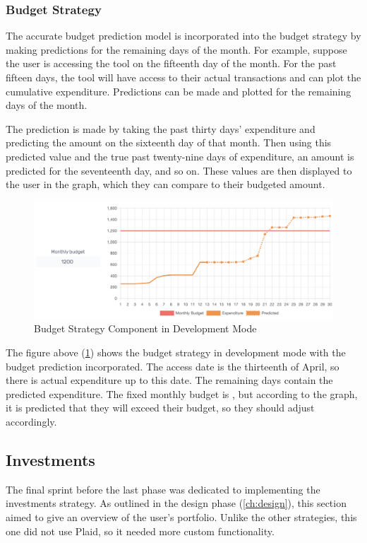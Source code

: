 \subsubsection{Budget Strategy}
The accurate budget prediction model is incorporated into the budget strategy by making predictions for the remaining days of the month. For example, suppose the user is accessing the tool on the fifteenth day of the month. For the past fifteen days, the tool will have access to their actual transactions and can plot the cumulative expenditure. Predictions can be made and plotted for the remaining days of the month.

The prediction is made by taking the past thirty days' expenditure and predicting the amount on the sixteenth day of that month. Then using this predicted value and the true past twenty-nine days of expenditure, an amount is predicted for the seventeenth day, and so on. These values are then displayed to the user in the graph, which they can compare to their budgeted amount.

\begin{figure}[H]
	\centering
	\includegraphics[width=\textwidth]{images/budget_strategy.png}
	\caption{Budget Strategy Component in Development Mode}
	\label{fig:BudgetStrategy}
\end{figure}

The figure above (\ref{fig:BudgetStrategy}) shows the budget strategy in development mode with the budget prediction incorporated. The access date is the thirteenth of April, so there is actual expenditure up to this date. The remaining days contain the predicted expenditure. The fixed monthly budget is , but according to the graph, it is predicted that they will exceed their budget, so they should adjust accordingly.

\subsection{Investments}
The final sprint before the last phase was dedicated to implementing the investments strategy. As outlined in the design phase (\ref{ch:design}), this section aimed to give an overview of the user's portfolio. Unlike the other strategies, this one did not use Plaid, so it needed more custom functionality.

